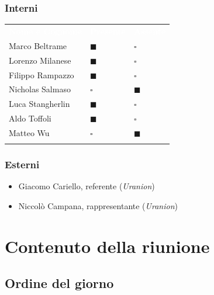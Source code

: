 \documentclass[12pt,a4paper]{article}
\newcommand{\tightlist}{\setlength{\itemsep}{1pt}\setlength{\parskip}{0pt}}
\begin{document}
\hypertarget{interni}{%
\subsubsection{Interni}}

\begin{center}
\begin{tabularx}{\linewidth}{>{\raggedright\arraybackslash}X>{\centering\arraybackslash}p{2.5cm}>{\centering\arraybackslash}p{2.5cm}}
\rowcolor{bfblue}\textcolor{white}{\textbf{Nome e Cognome}} & \textcolor{white}{\textbf{Presente}} & \textcolor{white}{\textbf{Assente}} \\
Marco Beltrame & $\blacksquare$ & $\square$ \\ \arrayrulecolor{bfline}\hline
Lorenzo Milanese & $\blacksquare$ & $\square$ \\ \arrayrulecolor{bfline}\hline
Filippo Rampazzo & $\blacksquare$ & $\square$ \\ \arrayrulecolor{bfline}\hline
Nicholas Salmaso & $\square$ & $\blacksquare$ \\ \arrayrulecolor{bfline}\hline
Luca Stangherlin & $\blacksquare$ & $\square$ \\ \arrayrulecolor{bfline}\hline
Aldo Toffoli & $\blacksquare$ & $\square$ \\ \arrayrulecolor{bfline}\hline
Matteo Wu & $\square$ & $\blacksquare$ \\ \arrayrulecolor{bfline}\hline
\end{tabularx}
\end{center}

\hypertarget{esterni}{%
\subsubsection{Esterni}}

\begin{itemize}
\tightlist
\item
  Giacomo Cariello, referente (\emph{Uranion})
\item
  Niccolò Campana, rappresentante (\emph{Uranion})
\end{itemize}

\hypertarget{contenuto-della-riunione}{%
\section{Contenuto della riunione}}

\hypertarget{ordine-del-giorno}{%
\subsection{Ordine del giorno}}
\end{document}
